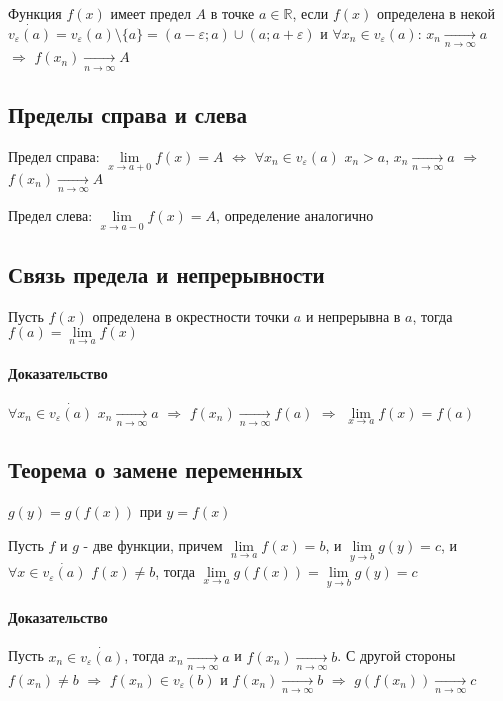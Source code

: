 \documentclass[class=article,a4paper,12pt,crop=false]{standalone}
\begin{document}
Функция $f(x)$ имеет предел $A$ в точке $a \in \mathbb{R}$, если 
$f(x)$ определена в некой $\dot{v_{\varepsilon}(a)} = v_{\varepsilon}(a) \setminus \{a\} =
(a - \varepsilon; a) \cup (a; a + \varepsilon)$ и $\forall x_n \in v_{\varepsilon}(a)$:
$x_n \underset{n \rightarrow \infty}{\rightarrow} a$ $\Rightarrow$
$f(x_n) \underset{n \rightarrow \infty}{\rightarrow} A$

\subsection{Пределы справа и слева}

Предел справа: $\lim\limits_{x \rightarrow a + 0}f(x) = A$ $\Leftrightarrow$
$\forall x_n \in v_{\varepsilon}(a)$ $x_n > a$, $x_n \underset{n \rightarrow \infty}{\rightarrow} a$
$\Rightarrow$ $f(x_n) \underset{n \rightarrow \infty}{\rightarrow} A$

Предел слева: $\lim\limits_{x \rightarrow a - 0}f(x) = A$, определение аналогично

\subsection{Связь предела и непрерывности}

Пусть $f(x)$ определена в окрестности точки $a$ и непрерывна в $a$, тогда
$f(a) = \lim\limits_{n \rightarrow a}f(x)$

\paragraph{Доказательство} $\forall x_n \in \dot{v_{\varepsilon}(a)}$
$x_n \underset{n \rightarrow \infty}{\rightarrow} a$ $\Rightarrow$
$f(x_n) \underset{n \rightarrow \infty}{\rightarrow} f(a)$ $\Rightarrow$
$\lim\limits_{x \rightarrow a}f(x) = f(a)$

\subsection{Теорема о замене переменных}

$g(y) = g(f(x))$ при $y = f(x)$

Пусть $f$ и $g$ - две функции, причем $\lim\limits_{n \rightarrow a}f(x) = b$, и
$\lim\limits_{y \rightarrow b}g(y) = c$, и $\forall x \in \dot{v_{\varepsilon}(a)}$
$f(x) \neq b$, тогда $\lim\limits_{x \rightarrow a}g(f(x)) = \lim\limits_{y \rightarrow b}g(y) = c$

\paragraph{Доказательство} Пусть $x_n \in \dot{v_{\varepsilon}(a)}$, тогда $x_n \underset{n \rightarrow \infty}{\rightarrow}
a$ и $f(x_n) \underset{n \rightarrow \infty}{\rightarrow} b$. С другой стороны
$f(x_n) \neq b$ $\Rightarrow$ $f(x_n) \in v_{\varepsilon}(b)$ и 
$f(x_n) \underset{n \rightarrow \infty}{\rightarrow} b$
$\Rightarrow$ $g(f(x_n)) \underset{n \rightarrow \infty}{\rightarrow} c$
\end{document}
